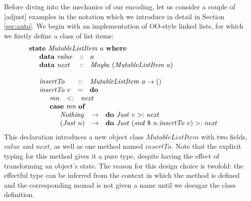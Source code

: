 \documentclass[runningheads,a4paper]{llncs}
\newcommand{\todo}[1]{[{\color{blue}#1}]}
\begin{document}
Before diving into the mechanics of our encoding, let us consider a couple of \todo{adjust} examples in the notation which we introduce in detail in Section \ref{sec:auto}. We begin with an implementation of OO-style linked lists, for which we firstly define a class of list items:
\begin{displaymath}
\begin{array}{l}
\mathbf{state}~\mathit{MutableListItem}~a~\mathbf{where} \\
\quad \begin{array}{lcl}
\mathbf{data}~\mathit{value} & :: & a \\
\mathbf{data}~\mathit{next}  & :: & \mathit{Maybe}~(\mathit{MutableListItem}~a)
\end{array}\\\\
\quad \begin{array}{lcl}
\mathit{insertTo} & :: & \mathit{MutableListItem}~a \to ()\\
\mathit{insertTo}~v & = & \mathbf{do} \\
\multicolumn{3}{l}{\quad \begin{array}{lcl}
\mathit{mn} & <: & \mathit{next} \\
\multicolumn{3}{l}{\mathbf{case}~\mathit{mn}~\mathbf{of}} \\
\multicolumn{3}{l}{\quad \begin{array}{lcl}
\mathit{Nothing} & \to & \mathbf{do}~\mathit{Just}~v >: \mathit{next} \\
(\mathit{Just}~n) & \to & \mathbf{do}~\mathit{Just}~(\mathit{snd}~\$~n.\mathit{insertTo}~v) >: \mathit{next}
\end{array}}
\end{array}}
\end{array}
\end{array}
\end{displaymath}
This declaration introduces a new object class $\mathit{MutableListItem}$ with two fields, $\mathit{value}$ and $\mathit{next}$, as well as one method named $\mathit{insertTo}$. Note that the explicit typing for this method gives it a pure type, despite having the effect of transforming an object's state. The reason for this design choice is twofold: the effectful type can be inferred from the context in which the method is defined and the corresponding monad is not given a name until we desugar the class definition. %
\end{document}
